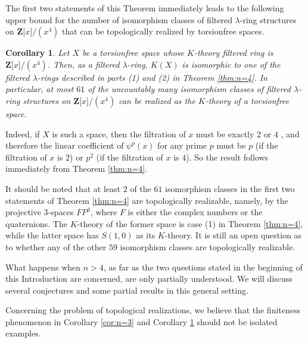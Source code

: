 \documentclass[reqno,11pt]{amsart}
\numberwithin{equation}{subsection}  %
\newtheorem{cor}[subsection]{Corollary}
\newcommand{\bZ}{\mathbf{Z}}
\begin{document}
The first two statements of this Theorem immediately leads to the following upper bound for the number of isomorphism classes of filtered $\lambda$-ring structures on $\bZ \lbrack x \rbrack/(x^4)$ that can be topologically realized by torsionfree spaces.


\medskip
\begin{cor}
\label{cor:n=4}
Let $X$ be a torsionfree space whose $K$-theory filtered ring is $\bZ \lbrack x \rbrack/(x^4)$.  Then, as a filtered $\lambda$-ring, $K(X)$ is isomorphic to one of the filtered $\lambda$-rings described in parts (1) and (2) in Theorem \ref{thm:n=4}.  In particular, at most $61$ of the uncountably many isomorphism classes of filtered $\lambda$-ring structures on $\bZ \lbrack x \rbrack/(x^4)$ can be realized as the $K$-theory of a torsionfree space.
\end{cor}


Indeed, if $X$ is such a space, then the filtration of $x$ must be exactly $2$ or $4$ \cite[Corollary 4L.10]{hatcher}, and therefore the linear coefficient of $\psi^p(x)$ for any prime $p$ must be $p$ (if the filtration of $x$ is $2$) or $p^2$ (if the filtration of $x$ is $4$).  So the result follows immediately from Theorem \ref{thm:n=4}.


It should be noted that at least $2$ of the $61$ isomorphism classes in the first two statements of Theorem \ref{thm:n=4} are topologically realizable, namely, by the projective $3$-spaces $FP^3$, where $F$ is either the complex numbers or the quaternions.  The $K$-theory of the former space is case (1) in Theorem \ref{thm:n=4}, while the latter space has $S(1,0)$ as its $K$-theory.  It is still an open question as to whether any of the other $59$ isomorphism classes are topologically realizable.




What happens when $n > 4$, as far as the two questions stated in the beginning of this Introduction are concerned, are only partially understood.  We will discuss several conjectures and some partial results in this general setting.


Concerning the problem of topological realizations, we believe that the finiteness phenomenon in Corollary \ref{cor:n=3} and Corollary \ref{cor:n=4} should not be isolated examples.


\end{document}
